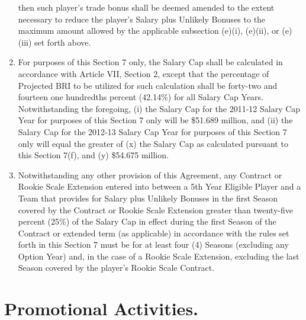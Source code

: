 \documentclass[
]{book}
\begin{document}
\begin{enumerate}
  then such player's trade bonus shall be deemed amended to the extent necessary to reduce the player's Salary plus Unlikely Bonuses to the maximum amount allowed by the applicable subsection (e)(i), (e)(ii), or (e)(iii) set forth above.
\item
  For purposes of this Section 7 only, the Salary Cap shall be calculated in accordance with Article VII, Section 2, except that the percentage of Projected BRI to be utilized for such calculation shall be forty-two and fourteen one hundredths percent (42.14\%) for all Salary Cap Years. Notwithstanding the foregoing, (i) the Salary Cap for the 2011-12 Salary Cap Year for purposes of this Section 7 only will be \$51.689 million, and (ii) the Salary Cap for the 2012-13 Salary Cap Year for purposes of this Section 7 only will equal the greater of (x) the Salary Cap as calculated pursuant to this Section 7(f), and (y) \$54.675 million.
\item
  Notwithstanding any other provision of this Agreement, any Contract or Rookie Scale Extension entered into between a 5th Year Eligible Player and a Team that provides for Salary plus Unlikely Bonuses in the first Season covered by the Contract or Rookie Scale Extension greater than twenty-five percent (25\%) of the Salary Cap in effect during the first Season of the Contract or extended term (as applicable) in accordance with the rules set forth in this Section 7 must be for at least four (4) Seasons (excluding any Option Year) and, in the case of a Rookie Scale Extension, excluding the last Season covered by the player's Rookie Scale Contract.
\end{enumerate}

\hypertarget{promotional-activities.}{%
\section{Promotional Activities.}\label{promotional-activities.}}
\end{document}
